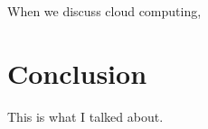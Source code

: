 \documentclass[DIV=calc, paper=letter, fontsize=12pt, twocolumn]{scrartcl}	 %
\begin{document}
When we discuss cloud computing,

\cite{lolz}

\section*{Conclusion}

This is what I talked about.







 

\end{document}
